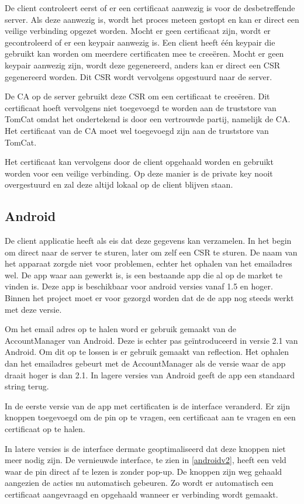 \documentclass[]{article}
\begin{document}
De client controleert eerst of er een certificaat aanwezig is voor de
desbetreffende server. Als deze aanwezig is, wordt het proces meteen gestopt en
kan er direct een veilige verbinding opgezet worden. Mocht er geen certificaat
zijn, wordt er gecontroleerd of er een keypair aanwezig is. Een client heeft
\'e\'en keypair die gebruikt kan worden om meerdere certificaten mee te
cree\"eren. Mocht er geen keypair aanwezig zijn, wordt deze gegenereerd, anders
kan er direct een CSR gegenereerd worden. Dit CSR wordt vervolgens opgestuurd
naar de server.

De CA op de server gebruikt deze CSR om een certificaat te cree\"eren. Dit
certificaat hoeft vervolgens niet toegevoegd te worden aan de truststore van
TomCat omdat het ondertekend is door een vertrouwde partij, namelijk de CA. Het
certificaat van de CA moet wel toegevoegd zijn aan de truststore van TomCat.

Het certificaat kan vervolgens door de client opgehaald worden en gebruikt
worden voor een veilige verbinding. Op deze manier is de private key nooit
overgestuurd en zal deze altijd lokaal op de client blijven staan. 

\subsection{Android}
De client applicatie heeft als eis dat deze gegevens kan verzamelen. In het
begin om direct naar de server te sturen, later om zelf een CSR te sturen. De
naam van het apparaat zorgde niet voor problemen, echter het ophalen van het
emailadres wel. De app waar aan gewerkt is, is een bestaande app die al op de
market te vinden is. Deze app is beschikbaar voor android versies vanaf 1.5 en
hoger. Binnen het project moet er voor gezorgd worden dat de de app nog steeds
werkt met deze versie.

Om het email adres op te halen word er gebruik gemaakt van de AccountManager van
Android. Deze is echter pas ge\"introduceerd in versie 2.1 van Android. Om dit
op te lossen is er gebruik gemaakt van reflection. Het ophalen dan het
emailadres gebeurt met de AccountManager als de versie waar de app draait hoger
is dan 2.1. In lagere versies van Android geeft de app een standaard string
terug.

In de eerste versie van de app met certificaten is de interface veranderd. Er
zijn knoppen toegevoegd om de pin op te vragen, een certificaat aan te vragen en
een certificaat op te halen.

In latere versies is de interface dermate geoptimaliseerd dat deze knoppen niet
meer nodig zijn. De vernieuwde interface, te zien in \ref{androidv2}, heeft een
veld waar de pin direct af te lezen is zonder pop-up. De knoppen zijn weg
gehaald aangezien de acties nu automatisch gebeuren. Zo wordt er automatisch een
certificaat aangevraagd en opgehaald wanneer er verbinding wordt gemaakt. 
\end{document}
